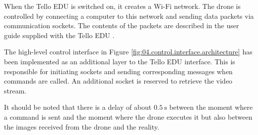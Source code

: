 When the Tello EDU is switched on, it creates a Wi-Fi network. The drone is controlled by connecting a computer to this network and sending data packets via communication sockets. The contents of the packets are described in the user guide supplied with the Tello EDU \cite{ryzerobotics2020telloeduusermanual}.

The high-level control interface in Figure \ref{fig:04.control.interface.architecture} has been implemented as an additional layer to the Tello EDU interface. This is responsible for initiating sockets and sending corresponding messages when commands are called. An additional socket is reserved to retrieve the video stream.

It should be noted that there is a delay of about $\SI{0.5}{\second}$ between the moment where a command is sent and the moment where the drone executes it but also between the images received from the drone and the reality.
